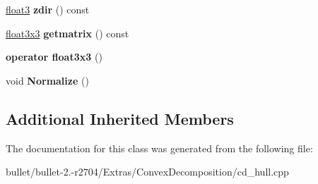 \begin{DoxyCompactItemize}
\item 
\hypertarget{class_convex_decomposition_1_1_quaternion_af4b768787cdeb57475dfd80a79a6c21a}{\hyperlink{class_convex_decomposition_1_1float3}{float3} {\bfseries zdir} () const }\label{class_convex_decomposition_1_1_quaternion_af4b768787cdeb57475dfd80a79a6c21a}

\item 
\hypertarget{class_convex_decomposition_1_1_quaternion_a5d2740da37e19a12a00204f035b4f698}{\hyperlink{class_convex_decomposition_1_1float3x3}{float3x3} {\bfseries getmatrix} () const }\label{class_convex_decomposition_1_1_quaternion_a5d2740da37e19a12a00204f035b4f698}

\item 
\hypertarget{class_convex_decomposition_1_1_quaternion_a76814140c0e5d56fdcc4cfc0234c9e30}{{\bfseries operator float3x3} ()}\label{class_convex_decomposition_1_1_quaternion_a76814140c0e5d56fdcc4cfc0234c9e30}

\item 
\hypertarget{class_convex_decomposition_1_1_quaternion_afb677e2938d9203828b3c9ffe1754f59}{void {\bfseries Normalize} ()}\label{class_convex_decomposition_1_1_quaternion_afb677e2938d9203828b3c9ffe1754f59}

\end{DoxyCompactItemize}
\subsection*{Additional Inherited Members}


The documentation for this class was generated from the following file\+:\begin{DoxyCompactItemize}
\item 
bullet/bullet-\/2.-\/r2704/\+Extras/\+Convex\+Decomposition/cd\+\_\+hull.\+cpp\end{DoxyCompactItemize}
